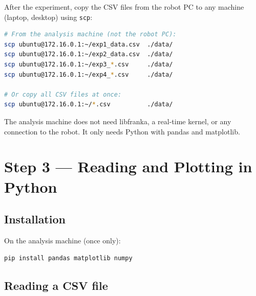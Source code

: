 After the experiment, copy the CSV files from the robot PC to any
machine (laptop, desktop) using \texttt{scp}:

\begin{lstlisting}[style=cppstyle, language=bash,
  caption={Copy CSV files from the robot workstation},
  label={lst:scp}]
# From the analysis machine (not the robot PC):
scp ubuntu@172.16.0.1:~/exp1_data.csv  ./data/
scp ubuntu@172.16.0.1:~/exp2_data.csv  ./data/
scp ubuntu@172.16.0.1:~/exp3_*.csv     ./data/
scp ubuntu@172.16.0.1:~/exp4_*.csv     ./data/

# Or copy all CSV files at once:
scp ubuntu@172.16.0.1:~/*.csv          ./data/
\end{lstlisting}

The analysis machine does not need libfranka, a real-time kernel,
or any connection to the robot.
It only needs Python with pandas and matplotlib.

\section{Step 3 --- Reading and Plotting in Python}

\subsection{Installation}

On the analysis machine (once only):

\begin{lstlisting}[style=cppstyle, language=bash,
  caption={Install Python analysis dependencies},
  label={lst:pip}]
pip install pandas matplotlib numpy
\end{lstlisting}

\subsection{Reading a CSV file}

